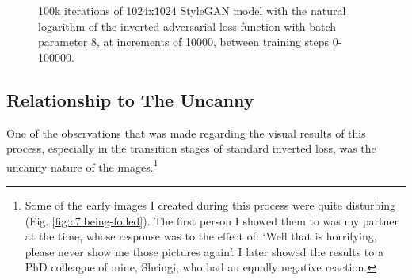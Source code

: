 \begin{figure}[!htbp]
  \centering
  \caption[100k iterations of 1024x1024 StyleGAN model with the natural logarithm of the inverted adversarial loss function]{100k iterations of 1024x1024 StyleGAN model with the natural logarithm of the inverted adversarial loss function with batch parameter 8, at increments of 10000, between training steps 0-100000.}
  \label{fig:c4:100k-iterations}
\end{figure}

\subsection{Relationship to The Uncanny}

One of the observations that was made regarding the visual results of this process, especially in the transition stages of standard inverted loss, was the uncanny nature of the images.\footnote{
      Some of the early images I created during this process were quite disturbing (Fig. \ref{fig:c7:being-foiled}). The first person I showed them to was my partner at the time, whose response was to the effect of: `Well that is horrifying, please never show me those pictures again'. I later showed the results to a PhD colleague of mine, Shringi, who had an equally negative reaction.}

